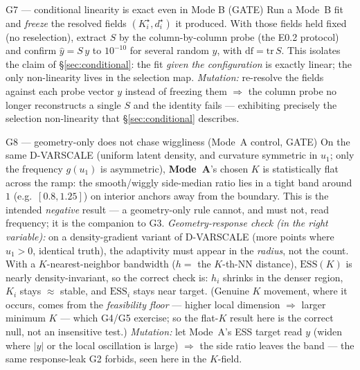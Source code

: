 \documentclass[11pt]{article}
\begin{document}
\begin{gate}{G7 --- conditional linearity is exact even in Mode B (GATE)}
Run a Mode~B fit and \emph{freeze} the resolved fields $(K^\star_i,d^\star_i)$ it
produced. With those fields held fixed (no reselection), extract $S$ by the
column-by-column probe (the E0.2 protocol) and confirm $\hat y=S\,y$ to $10^{-10}$ for
several random $y$, with $\mathrm{df}=\mathrm{tr}\,S$. This isolates the claim of
\S\ref{sec:conditional}: the fit \emph{given the configuration} is exactly linear; the
only non-linearity lives in the selection map. \emph{Mutation:} re-resolve the fields
against each probe vector $y$ instead of freezing them $\Rightarrow$ the column probe no
longer reconstructs a single $S$ and the identity fails --- exhibiting precisely the
selection non-linearity that \S\ref{sec:conditional} describes.
\end{gate}

\begin{gate}{G8 --- geometry-only does not chase wiggliness (Mode~A control, GATE)}
On the same D-VARSCALE (uniform latent density, and curvature symmetric in $u_1$; only the
frequency $g(u_1)$ is asymmetric), \textbf{Mode~A}'s chosen $K$ is statistically flat across
the ramp: the smooth/wiggly side-median ratio lies in a tight band around $1$ (e.g.\
$[0.8,1.25]$) on interior anchors away from the boundary. This is the intended
\emph{negative} result --- a geometry-only rule cannot, and must not, read frequency; it is
the companion to G3.
\emph{Geometry-response check (in the right variable):} on a density-gradient variant of
D-VARSCALE (more points where $u_1>0$, identical truth), the adaptivity must appear in the
\emph{radius}, not the count. With a $K$-nearest-neighbor bandwidth ($h=$ the $K$-th-NN
distance), $\mathrm{ESS}(K)$ is nearly density-invariant, so the correct check is: $h_i$
shrinks in the denser region, $K_i$ stays $\approx$ stable, and $\mathrm{ESS}_i$ stays near
target. (Genuine $K$ movement, where it occurs, comes from the \emph{feasibility floor} ---
higher local dimension $\Rightarrow$ larger minimum $K$ --- which G4/G5 exercise; so the
flat-$K$ result here is the correct null, not an insensitive test.) \emph{Mutation:} let
Mode~A's ESS target read $y$ (widen where $|y|$ or the local oscillation is large)
$\Rightarrow$ the side ratio leaves the band --- the same response-leak G2 forbids, seen
here in the $K$-field.
\end{gate}
\end{document}
